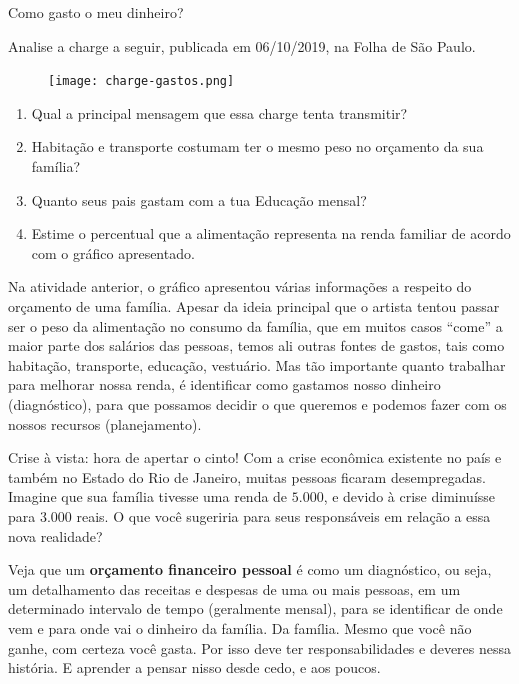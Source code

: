 \begin{task}{Como gasto o meu dinheiro?}

Analise a charge a seguir, publicada em 06/10/2019, na Folha de São Paulo.

\begin{figure}[H]
\centering
\texttt{[image: charge-gastos.png]}

\end{figure}

\begin{enumerate}
\item Qual a principal mensagem que essa charge tenta transmitir?
\item Habitação e transporte costumam ter o mesmo peso no orçamento da sua família?
\item Quanto seus pais gastam com a tua Educação mensal?
\item Estime o percentual que a alimentação representa na renda familiar de acordo com o gráfico apresentado.

\end{enumerate}
\end{task}

Na atividade anterior, o gráfico apresentou várias informações a respeito do orçamento de uma família. Apesar da ideia principal que o artista tentou passar ser o peso da alimentação no consumo da família, que em muitos casos “come” a maior parte dos salários das pessoas, temos ali outras fontes de gastos, tais como habitação, transporte, educação, vestuário. Mas tão importante quanto trabalhar para melhorar nossa renda, é identificar como gastamos nosso dinheiro (diagnóstico), para que possamos decidir o que queremos e podemos fazer com os nossos recursos (planejamento). 


\begin{task}{Crise à vista: hora de apertar o cinto!}
Com a crise econômica existente no país e também no Estado do Rio de Janeiro, muitas pessoas ficaram desempregadas. Imagine que sua família tivesse uma renda de $5.000$, e devido à crise diminuísse para $3.000$ reais. O que você sugeriria para seus responsáveis em relação a essa nova realidade?
\end{task}


Veja que um \textbf{orçamento financeiro pessoal} é como um diagnóstico, ou seja, um detalhamento das receitas e despesas de uma ou mais pessoas, em um determinado intervalo de tempo (geralmente mensal), para se identificar de onde vem e para onde vai o dinheiro da família. Da família. Mesmo que você não ganhe, com certeza você gasta. Por isso deve ter responsabilidades e deveres nessa história. E aprender a pensar nisso desde cedo, e aos poucos.

